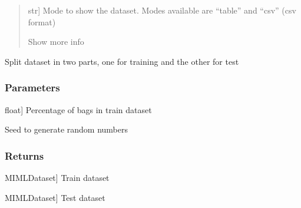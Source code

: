 \documentclass[letterpaper,10pt,english]{sphinxmanual}
\begin{document}
\begin{fulllineitems}
\begin{fulllineitems}
\begin{quote}
\begin{description}
\sphinxlineitem{mode}{[}str{]}
\sphinxAtStartPar
Mode to show the dataset. Modes available are “table” and “csv” (csv format)

\sphinxAtStartPar
Show more info

\end{description}
\end{quote}

\end{fulllineitems}


\begin{fulllineitems}
\label{\detokenize{data/_autosummary/miml.data.miml_dataset.MIMLDataset:miml.data.miml_dataset.MIMLDataset.split_dataset}}
\pysigstartsignatures
{}
\pysigstopsignatures
\sphinxAtStartPar
Split dataset in two parts, one for training and the other for test


\subsubsection{Parameters}
\label{\detokenize{data/_autosummary/miml.data.miml_dataset.MIMLDataset:id36}}\begin{description}
\sphinxlineitem{train\_percentage}{[}float{]}
\sphinxAtStartPar
Percentage of bags in train dataset

\sphinxAtStartPar
Seed to generate random numbers

\end{description}


\subsubsection{Returns}
\label{\detokenize{data/_autosummary/miml.data.miml_dataset.MIMLDataset:id37}}\begin{description}
\sphinxlineitem{dataset\_train}{[}MIMLDataset{]}
\sphinxAtStartPar
Train dataset

\sphinxlineitem{dataset\_test}{[}MIMLDataset{]}
\sphinxAtStartPar
Test dataset


\end{description}
\end{fulllineitems}
\end{fulllineitems}
\end{document}
